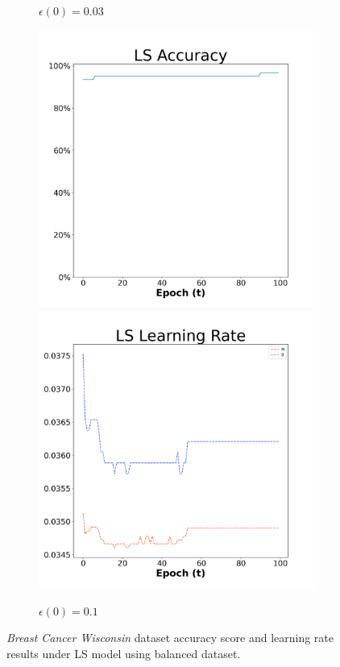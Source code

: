 \begin{figure}[H]
\begin{subfigure}{0.3\textwidth}
  \caption{$\epsilon(0)=0.03$}
\end{subfigure}\hfil %
\begin{subfigure}{0.3\textwidth}
  \includegraphics[width=\linewidth]{images/exper1/breast/LS_0.1_acc.png}
  \includegraphics[width=\linewidth]{images/exper1/breast/LS_0.1_lr.png}
  \caption{$\epsilon(0)=0.1$}
\end{subfigure}

\caption{\textit{Breast Cancer Wisconsin} dataset accuracy score and learning rate results under LS model using balanced dataset.}
\end{figure}

